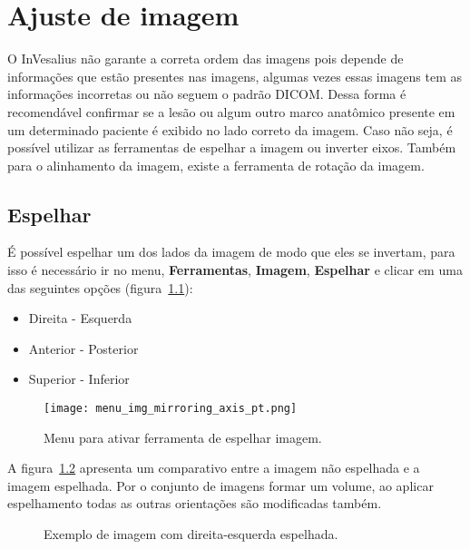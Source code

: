 \chapter{Ajuste de imagem}

O InVesalius não garante a correta ordem das imagens pois depende de informações que estão presentes nas imagens, algumas vezes essas imagens tem as informações incorretas ou não seguem o padrão DICOM. Dessa forma é recomendável confirmar se a lesão ou algum outro marco anatômico presente em um determinado paciente é exibido no lado correto da imagem. Caso não seja, é possível utilizar as ferramentas de espelhar a imagem ou inverter eixos. Também para o alinhamento da imagem, existe a ferramenta de rotação da imagem.

\section{Espelhar}

É possível espelhar um dos lados da imagem de modo que eles se invertam, para isso é necessário ir no menu, \textbf{Ferramentas}, \textbf{Imagem}, \textbf{Espelhar} e clicar em uma das seguintes opções (figura~\ref{fig:menu_img_mirroring_axis_pt}):

\begin{itemize}
	\item Direita - Esquerda
	\item Anterior - Posterior
	\item Superior - Inferior
\end{itemize}

\begin{figure}[!htb]
\centering
\texttt{[image: menu\_img\_mirroring\_axis\_pt.png]}
\caption{Menu para ativar ferramenta de espelhar imagem.}
\label{fig:menu_img_mirroring_axis_pt}
\end{figure}


A figura~\ref{fig:mirrored} apresenta um comparativo entre a imagem não espelhada e a imagem espelhada. Por o conjunto de imagens formar um volume, ao aplicar espelhamento todas as outras orientações são modificadas também.

\begin{figure}[!htb]
  \centering
    \qquad
  \hfill
  \caption{Exemplo de imagem com direita-esquerda espelhada.}
  \label{fig:mirrored}
\end{figure}

